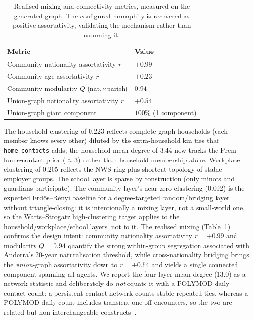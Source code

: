 \documentclass[a4paper,12pt]{article}
\begin{document}
\begin{table}[H]
\caption{Realised-mixing and connectivity metrics, measured on the generated graph.
The configured homophily is recovered as positive assortativity, validating the
mechanism rather than assuming it.}
\label{tab:network_mixing}
\begin{tabularx}{\textwidth}{lX}
\toprule
\textbf{Metric} & \textbf{Value} \\
\midrule
Community nationality assortativity $r$ & $+0.99$ \\
Community age assortativity $r$         & $+0.23$ \\
Community modularity $Q$ (nat.$\times$parish) & $0.94$ \\
Union-graph nationality assortativity $r$ & $+0.54$ \\
Union-graph giant component             & $100\%$ (1 component) \\
\bottomrule
\end{tabularx}
\end{table}

The household clustering of 0.223 reflects complete-graph households (each member
knows every other) diluted by the extra-household kin ties that \texttt{home\_contacts}
adds; the household mean degree of 3.44 now tracks the Prem home-contact prior
($\approx$3) rather than household membership alone. Workplace clustering of 0.205
reflects the NWS ring-plus-shortcut topology of stable employer groups. The school
layer is sparse by construction (only minors and guardians participate). The community
layer's near-zero clustering (0.002) is the expected Erd\H{o}s--R\'enyi baseline for a
degree-targeted random/bridging layer without triangle-closing: it is intentionally a
mixing layer, not a small-world one, so the Watts--Strogatz high-clustering target
applies to the household/workplace/school layers, not to it. The realised mixing
(Table~\ref{tab:network_mixing}) confirms the design intent: community nationality
assortativity $r = +0.99$ and modularity $Q = 0.94$ quantify the strong within-group
segregation associated with Andorra's 20-year naturalisation threshold, while
cross-nationality bridging brings the \emph{union}-graph assortativity down to
$r = +0.54$ and yields a single connected component spanning all agents. We report the
four-layer mean degree (13.0) as a network statistic and deliberately do \emph{not}
equate it with a POLYMOD daily-contact count: a persistent contact network counts
stable repeated ties, whereas a POLYMOD daily count includes transient one-off
encounters, so the two are related but non-interchangeable
constructs~\cite{danon2013social}.
\end{document}

